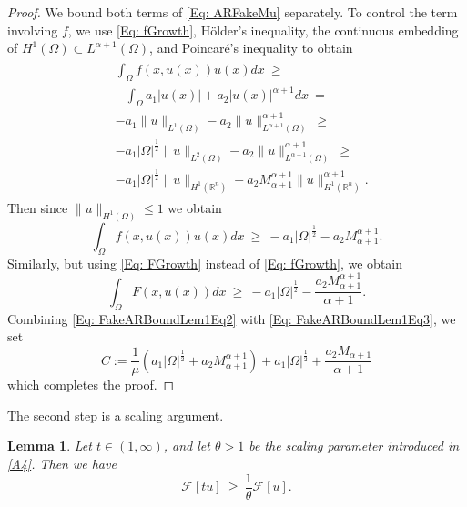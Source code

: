\documentclass[11pt]{amsart}   	%
\theoremstyle{plain}
\numberwithin{equation}{section}
\newtheorem{lemma}[thm]{Lemma}
\def\al{\alpha}
\def\Om{\Omega}
\def\th{\theta}
\def\R{\mathbb{R}}
\begin{document}
\begin{proof}
We bound both terms of \eqref{Eq: ARFakeMu} separately. To control the term involving $f$, we use \eqref{Eq: fGrowth}, Hölder's inequality, the continuous embedding of $H^1(\Om) \subset L^{\al + 1}(\Om)$, and Poincaré's inequality to obtain
\begin{eqnarray}\label{Eq: FakeARBoundLem1Eq1}
    \begin{aligned}
       & \int_{\Om}f(x, u(x))u(x)dx \ \geq \ \\
       &-\int_{\Om}a_1|u(x)| + a_2|u(x)|^{\al + 1}dx \ = \ \\
       &-a_1\|u\|_{L^1(\Om)} - a_2\|u\|^{\al + 1}_{L^{\al + 1}(\Om)} \ \geq \ \\
       &-a_1|\Om|^{\frac{1}{2}}\|u\|_{L^2(\Om)} - a_2\|u\|^{\al + 1}_{L^{\al + 1}(\Om)} \ \geq \ \\
       &-a_1|\Om|^{\frac{1}{2}}\|u\|_{H^1(\R^n)} - a_2M^{\al + 1}_{\al + 1}\|u\|^{\al + 1}_{H^1(\R^n)}.
    \end{aligned}
\end{eqnarray}
Then since $\|u\|_{H^1(\Om)} \leq 1$ we obtain
\begin{equation}\label{Eq: FakeARBoundLem1Eq2}
    \int_{\Om}f(x, u(x))u(x)dx \ \geq \ -a_1|\Om|^{\frac{1}{2}} - a_2M^{\al + 1}_{\al + 1}.
\end{equation}
Similarly, but using \eqref{Eq: FGrowth} instead of \eqref{Eq: fGrowth}, we obtain
\begin{equation}\label{Eq: FakeARBoundLem1Eq3}
    \int_{\Om}F(x, u(x))dx \ \geq \ -a_1|\Om|^{\frac{1}{2}} - \frac{a_2M^{\al + 1}_{\al + 1}}{\al + 1}.
\end{equation}
Combining \eqref{Eq: FakeARBoundLem1Eq2} with \eqref{Eq: FakeARBoundLem1Eq3}, we set
$$C := \frac{1}{\mu}(a_1|\Om|^{\frac{1}{2}} + a_2M^{\al + 1}_{\al + 1}) + a_1|\Om|^{\frac{1}{2}} + \frac{a_2M_{\al + 1}}{\al + 1}$$
which completes the proof.
\end{proof}

The second step is a scaling argument.

\begin{lemma}\label{Lem: FakeARBoundLem2}
   Let $t \in (1, \infty)$, and let $\th > 1$ be the scaling parameter introduced in \ref{A4}. Then we have
    \begin{equation}\label{Eq: FakeARBoundLem2Eq}
        \mathscr{F}[tu] \ \geq \ \frac{1}{\th}\mathscr{F}[u].
    \end{equation}
\end{lemma}
\end{document}
